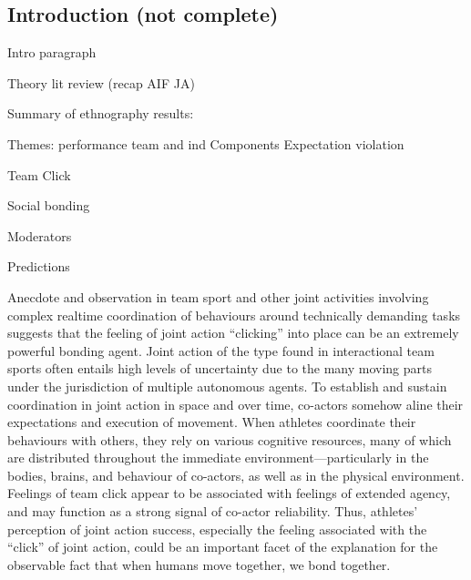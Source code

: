 \begin{CJK}{UTF8}{gbsn}
\section{Introduction (not complete)}

Intro paragraph

Theory lit review (recap AIF JA)

Summary of ethnography results:

      Themes:
       performance
          team and ind
          Components
          Expectation violation

      Team Click

      Social bonding

      Moderators


Predictions


Anecdote and observation in team sport and other joint activities involving complex realtime coordination of behaviours around technically demanding tasks suggests that
the feeling of joint action ``clicking'' into place can be an extremely powerful bonding agent. Joint action of the type found in interactional team sports often entails high levels of uncertainty due to the many moving parts under the jurisdiction of multiple autonomous agents.  To establish and sustain coordination in joint action in space and over time, co-actors somehow aline their expectations and execution of movement. When athletes coordinate their behaviours with others, they rely on various cognitive resources, many of which are distributed throughout the immediate environment---particularly in the bodies, brains, and behaviour of co-actors, as well as in the physical environment.  Feelings of team click appear to be associated with feelings of extended agency, and may function as a strong signal of co-actor reliability.  Thus, athletes' perception of joint action success, especially the feeling associated with the ``click'' of joint action, could be an important facet of the explanation for the observable fact that when humans move together, we bond together.


\end{CJK}
